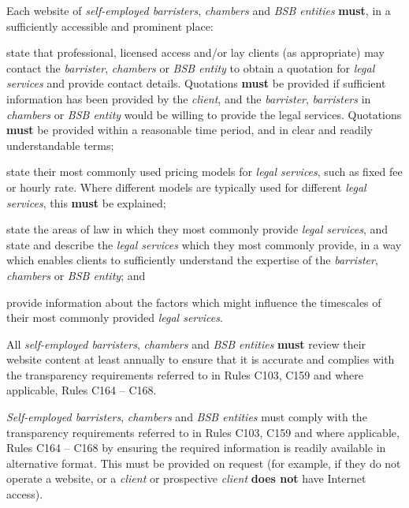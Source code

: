 Each website of \emph{self-employed barristers}, \emph{chambers} and
\emph{BSB entities} \textcolor{myred}{\textbf{must}}, in a sufficiently accessible and prominent
place:
\begin{numlist}\item state that professional, licensed access and/or lay clients (as
appropriate) may contact the \emph{barrister}, \emph{chambers} or
\emph{BSB entity} to obtain a quotation for \emph{legal services} and
provide contact details. Quotations \textcolor{myred}{\textbf{must}} be provided if sufficient
information has been provided by the \emph{client}, and the
\emph{barrister}, \emph{barristers} in \emph{chambers} or \emph{BSB
entity} would be willing to provide the legal services. Quotations \textcolor{myred}{\textbf{must}}
be provided within a reasonable time period, and in clear and readily
understandable terms;
\item state their most commonly used pricing models for \emph{legal
services}, such as fixed fee or hourly rate. Where different models are
typically used for different \emph{legal services}, this \textcolor{myred}{\textbf{must}} be
explained;
\item state the areas of law in which they most commonly provide
\emph{legal services}, and state and describe the \emph{legal services}
which they most commonly provide, in a way which enables clients to
sufficiently understand the expertise of the \emph{barrister},
\emph{chambers} or \emph{BSB entity}; and
\item provide information about the factors which might influence the
timescales of their most commonly provided \emph{legal services}.
\end{numlist}

All \emph{self-employed barristers}, \emph{chambers} and \emph{BSB
entities} \textcolor{myred}{\textbf{must}} review their website content at least annually to ensure
that it is accurate and complies with the transparency requirements
referred to in Rules C103, C159 and where applicable, Rules C164 --
C168.


\emph{Self-employed barristers}, \emph{chambers} and \emph{BSB entities}
must comply with the transparency requirements referred to in Rules
C103, C159 and where applicable, Rules C164 -- C168 by ensuring the
required information is readily available in alternative format. This
must be provided on request (for example, if they do not operate a
website, or a \emph{client} or prospective \emph{client} \textcolor{myred}{\textbf{does not}} have
Internet access).

